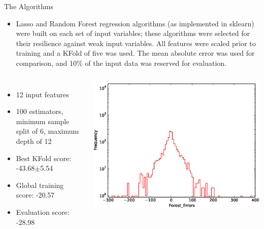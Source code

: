 \documentclass[pdf]{beamer}
\begin{document}
\begin{frame}{The Algorithms}
\begin{itemize}
\item{Lasso and Random Forest regression algorithms (as implemented in sklearn) were built on each set of input variables; these algorithms were selected for their resilience against weak input variables.  All features were scaled prior to training and a KFold of five was used.  The mean absolute error was used for comparison, and 10$\%$ of the input data was reserved for evaluation.}
\end{itemize}
\begin{columns}
\begin{itemize}
\item{12 input features}
\item{100 estimators, minimum sample split of 6, maximum depth of 12}
\item{Best KFold score: -43.68$\pm$5.54}
\item{Global training score: -20.57}
\item{Evaluation score: -28.98} 
\end{itemize}
\begin{center}
\includegraphics[width=1.05\textwidth]{plots/Forest_Errors_12.eps}
\end{center}
\end{columns}
\end{frame}

\end{document}
